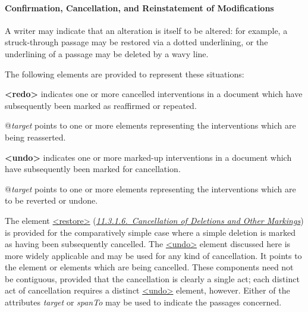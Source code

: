 \paragraph[{Confirmation, Cancellation, and Reinstatement of Modifications}]{Confirmation, Cancellation, and Reinstatement of Modifications}\label{undo}\par
 A writer may  indicate that an alteration is itself to be altered: for example, a struck-through passage may be restored via a dotted underlining, or the underlining of a passage may be deleted by a wavy line.\par
The following elements are provided to represent these situations: 
\begin{sansreflist}
  
\item [\textbf{<redo>}] indicates one or more cancelled interventions in a document which have subsequently been marked as reaffirmed or repeated.\hfil\\[-10pt]\begin{sansreflist}
    \item[@{\itshape target}]
  points to one or more elements representing the interventions which are being reasserted.
\end{sansreflist}  
\item [\textbf{<undo>}] indicates one or more marked-up interventions in a document which have subsequently been marked for cancellation.\hfil\\[-10pt]\begin{sansreflist}
    \item[@{\itshape target}]
  points to one or more elements representing the interventions which are to be reverted or undone.
\end{sansreflist}  
\end{sansreflist}
\par
The element \hyperref[TEI.restore]{<restore>} (\textit{\hyperref[PHCD]{11.3.1.6.\ Cancellation of Deletions and Other Markings}}) is provided for the comparatively simple case where a simple deletion is marked as having been subsequently cancelled. The \hyperref[TEI.undo]{<undo>} element discussed here is more widely applicable and may be used for any kind of cancellation. It points to the element or elements which are being cancelled. These components need not be contiguous, provided that the cancellation is clearly a single act; each distinct act of cancellation requires a distinct \hyperref[TEI.undo]{<undo>} element, however. Either of the attributes {\itshape target} or {\itshape spanTo} may be used to indicate the passages concerned.\par
